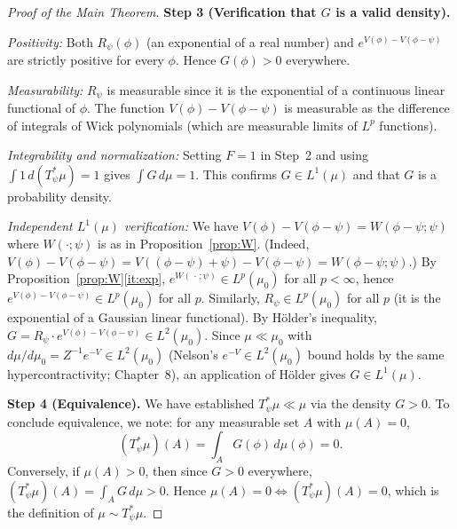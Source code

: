 \documentclass[12pt]{article}
\theoremstyle{definition}
\begin{document}
\begin{proof}[Proof of the Main Theorem]
\medskip
\noindent\textbf{Step 3 (Verification that $G$ is a valid density).}

\emph{Positivity:} Both $R_\psi(\phi)$ (an exponential of a real number) and
$e^{V(\phi)-V(\phi-\psi)}$ are strictly positive for every $\phi$. Hence $G(\phi) > 0$ everywhere.

\emph{Measurability:} $R_\psi$ is measurable since it is the exponential of a continuous
linear functional of $\phi$. The function $V(\phi)-V(\phi-\psi)$ is measurable as the difference
of integrals of Wick polynomials (which are measurable limits of $L^p$ functions).

\emph{Integrability and normalization:} Setting $F = 1$ in Step~2 and using
$\int 1\, d(T_\psi^*\mu) = 1$ gives $\int G\, d\mu = 1$. This confirms $G \in L^1(\mu)$ and that
$G$ is a probability density.

\emph{Independent $L^1(\mu)$ verification:} We have $V(\phi) - V(\phi-\psi) = W(\phi-\psi;\psi)$
where $W(\cdot;\psi)$ is as in Proposition~\ref{prop:W}. (Indeed, $V(\phi) - V(\phi-\psi) =
V((\phi-\psi)+\psi) - V(\phi-\psi) = W(\phi-\psi;\psi)$.) By Proposition~\ref{prop:W}\eqref{it:exp},
$e^{W(\,\cdot\,;\psi)} \in L^p(\mu_0)$ for all $p < \infty$, hence
$e^{V(\phi)-V(\phi-\psi)} \in L^p(\mu_0)$ for all $p$. Similarly, $R_\psi \in L^p(\mu_0)$ for all
$p$ (it is the exponential of a Gaussian linear functional). By H\"{o}lder's inequality,
$G = R_\psi \cdot e^{V(\phi)-V(\phi-\psi)} \in L^2(\mu_0)$. Since $\mu \ll \mu_0$ with
$d\mu/d\mu_0 = Z^{-1}e^{-V} \in L^2(\mu_0)$ (Nelson's $e^{-V} \in L^2(\mu_0)$ bound holds by
the same hypercontractivity; \cite{glimmjaffe} Chapter~8), an application of H\"{o}lder gives
$G \in L^1(\mu)$.

\medskip
\noindent\textbf{Step 4 (Equivalence).}
We have established $T_\psi^*\mu \ll \mu$ via the density $G > 0$. To conclude equivalence,
we note: for any measurable set $A$ with $\mu(A) = 0$,
\[
  (T_\psi^*\mu)(A) = \int_A G(\phi)\, d\mu(\phi) = 0.
\]
Conversely, if $\mu(A) > 0$, then since $G > 0$ everywhere,
$(T_\psi^*\mu)(A) = \int_A G\, d\mu > 0$. Hence $\mu(A) = 0 \Leftrightarrow (T_\psi^*\mu)(A) = 0$,
which is the definition of $\mu \sim T_\psi^*\mu$.
\end{proof}
\end{document}
